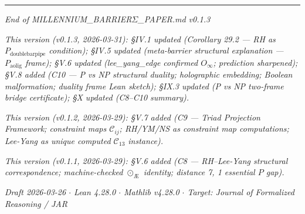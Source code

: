 \documentclass[12pt,a4paper]{article}
\newcommand{\pilcrow}{\S}
\begin{document}
\begin{center}
\rule{0.5\textwidth}{0.4pt}
\end{center}

\emph{End of MILLENNIUM\_BARRIER$\Sigma$\_PAPER.md v0.1.3}

\emph{This version (v0.1.3, 2026-03-31): \pilcrow{}IV.1 updated (Corollary 29.2 --- RH as $P_{\text{doublebarpipe}}$ condition); \pilcrow{}IV.5 updated (meta-barrier structural explanation --- $P_{\text{aolig}}$ frame); \pilcrow{}V.6 updated (lee\_yang\_edge confirmed $O_{\infty}$; prediction sharpened); \pilcrow{}V.8 added (C10 --- P vs NP structural duality; holographic embedding; Boolean malformation; duality frame Lean sketch); \pilcrow{}IX.3 updated (P vs NP two-frame bridge certificate); \pilcrow{}X updated (C8--C10 summary).}

\emph{This version (v0.1.2, 2026-03-29): \pilcrow{}V.7 added (C9 --- Triad Projection Framework; constraint maps $\mathcal{C}_{ij}$; RH/YM/NS as constraint map computations; Lee-Yang as unique computed $\mathcal{C}_{13}$ instance).}

\emph{This version (v0.1.1, 2026-03-29): \pilcrow{}V.6 added (C8 --- RH--Lee-Yang structural correspondence; machine-checked $\odot_{\text{Æ}}$ identity; distance 7, 1 essential $P$ gap).}

\emph{Draft 2026-03-26 $\cdot$ Lean 4.28.0 $\cdot$ Mathlib v4.28.0 $\cdot$ Target: Journal of Formalized Reasoning / JAR}
\end{document}
